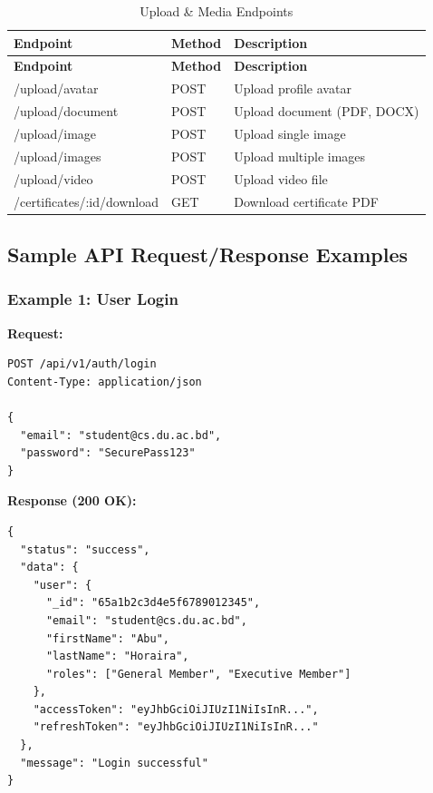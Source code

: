 \documentclass[12pt,a4paper]{article}
\begin{document}
\begin{longtable}{>{\small\ttfamily}p{6.5cm}%
                  >{\small\centering\arraybackslash}p{1.3cm}%
                  >{\small}p{6.7cm}}
\caption{Upload \& Media Endpoints} \\

\rowcolor{Teal}
\color{white}\normalfont\bfseries Endpoint & \color{white}\bfseries Method & \color{white}\bfseries Description \\
\endfirsthead
\rowcolor{Teal}
\color{white}\normalfont\bfseries Endpoint & \color{white}\bfseries Method & \color{white}\bfseries Description \\
\endhead

\midrule
\rowcolor{LightTeal}/upload/avatar & POST & Upload profile avatar \\
/upload/document & POST & Upload document (PDF, DOCX) \\
\rowcolor{LightTeal}/upload/image & POST & Upload single image \\
/upload/images & POST & Upload multiple images \\
\rowcolor{LightTeal}/upload/video & POST & Upload video file \\
/certificates/:id/download & GET & Download certificate PDF \\
\bottomrule
\end{longtable}

\subsection{Sample API Request/Response Examples}

\subsubsection{Example 1: User Login}

\textbf{Request:}
\begin{lstlisting}
POST /api/v1/auth/login
Content-Type: application/json

{
  "email": "student@cs.du.ac.bd",
  "password": "SecurePass123"
}
\end{lstlisting}

\textbf{Response (200 OK):}
\begin{lstlisting}
{
  "status": "success",
  "data": {
    "user": {
      "_id": "65a1b2c3d4e5f6789012345",
      "email": "student@cs.du.ac.bd",
      "firstName": "Abu",
      "lastName": "Horaira",
      "roles": ["General Member", "Executive Member"]
    },
    "accessToken": "eyJhbGciOiJIUzI1NiIsInR...",
    "refreshToken": "eyJhbGciOiJIUzI1NiIsInR..."
  },
  "message": "Login successful"
}
\end{lstlisting}
\end{document}
